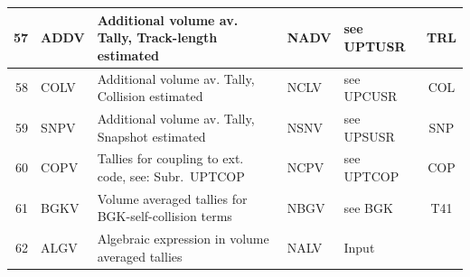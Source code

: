 \begin{landscape}
\begin{longtable}{|r|l|l|l|l|c|}
    \\ \hline
    57                                                             & ADDV
                                                                   & Additional volume av.
    Tally, Track-length estimated                                  & NADV                      & see
    UPTUSR                                                         & TRL                                                            \\
    \hline
    58                                                             & COLV
                                                                   & Additional volume av.
    Tally, Collision estimated                                     & NCLV
                                                                   & see UPCUSR                & COL                                \\
    \hline
    59                                                             & SNPV
                                                                   & Additional volume av.
    Tally, Snapshot estimated                                      & NSNV
                                                                   & see UPSUSR                & SNP                                \\
    \hline
    60                                                             & COPV
                                                                   & Tallies for coupling to
    ext. code, see: Subr.\ UPTCOP
                                                                   & NCPV
                                                                   & see UPTCOP
                                                                   & COP
    \\  \hline
    61                                                             & BGKV
                                                                   & Volume averaged tallies
    for \acs{BGK}-self-collision terms
                                                                   & NBGV
                                                                   & see BGK
                                                                   & T41
    \\  \hline
    62                                                             & ALGV
                                                                   & Algebraic expression in
    volume averaged tallies
                                                                   & NALV
                                                                   & Input

\end{longtable}
\end{landscape}
